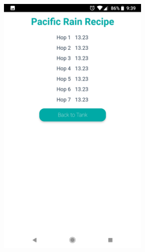 \documentclass[draftclsnofoot,onecolumn,letterpaper,10pt,compsoc]{IEEEtran}
\begin{document}
\begin{figure}
	\centering
	\includegraphics[height=13cm]{screenshots/mobile/recipe.png}
\end{figure}
\end{document}
